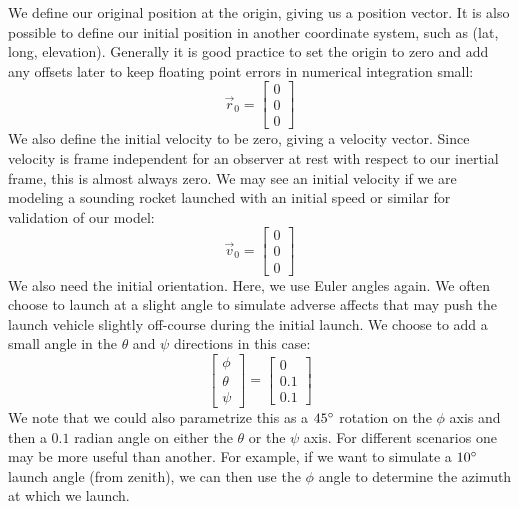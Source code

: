 \documentclass[12pt]{report}
\begin{document}
{We define our original position at the origin, giving us a position vector. It is also possible to define our initial position in another coordinate system, such as (lat, long, elevation). Generally it is good practice to set the origin to zero and add any offsets later to keep floating point errors in numerical integration small:
$$\vec{r}_0=\begin{bmatrix}
    0\\0\\0
\end{bmatrix}$$
We also define the initial velocity to be zero, giving a velocity vector. Since velocity is frame independent for an observer at rest with respect to our inertial frame, this is almost always zero. We may see an initial velocity if we are modeling a sounding rocket launched with an initial speed or similar for validation of our model:
$$\vec{v}_0=\begin{bmatrix}
    0\\0\\0
\end{bmatrix}$$
We also need the initial orientation. Here, we use \gls{Euler angles} again. We often choose to launch at a slight angle to simulate adverse affects that may push the launch vehicle slightly off-course during the initial launch. We choose to add a small angle in the $\theta$ and $\psi$ directions in this case:
\begin{equation}\label{eq: euler angles 6DoF}
    \begin{bmatrix}
    \phi\\\theta\\\psi
\end{bmatrix} =
\begin{bmatrix}
    0\\0.1\\0.1
\end{bmatrix}
\end{equation}
We note that we could also parametrize this as a $45\degree$ rotation on the $\phi$ axis and then a $0.1$ radian angle on either the $\theta$ or the $\psi$ axis. For different scenarios one may be more useful than another. For example, if we want to simulate a $10\degree$ launch angle (from zenith), we can then use the $\phi$ angle to determine the azimuth at which we launch.

}
\end{document}
